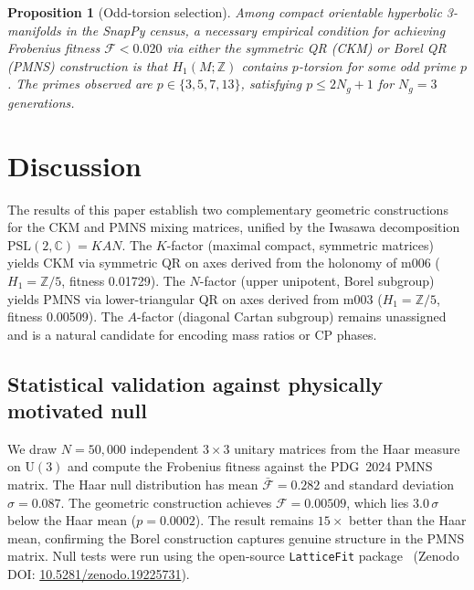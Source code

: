 \documentclass[11pt,a4paper]{article}
\newtheorem{proposition}{Proposition}
\newcommand{\PSL}{\mathrm{PSL}(2,\mathbb{C})}
\begin{document}
\begin{proposition}[Odd-torsion selection]
\label{prop:oddtorsion}
Among compact orientable hyperbolic 3-manifolds in the SnapPy census,
a necessary empirical condition for achieving Frobenius fitness
$\mathcal{F} < 0.020$ via either the symmetric QR \emph{(CKM)} or
Borel QR \emph{(PMNS)} construction is that $H_1(M;\mathbb{Z})$
contains $p$-torsion for some odd prime $p$.
The primes observed are $p \in \{3, 5, 7, 13\}$, satisfying
$p \leq 2N_g + 1$ for $N_g = 3$ generations.
\end{proposition}

\section{Discussion}
\label{sec:discussion}

The results of this paper establish two complementary geometric
constructions for the CKM and PMNS mixing matrices, unified by the
Iwasawa decomposition $\PSL = KAN$.
The $K$-factor (maximal compact, symmetric matrices) yields CKM
via symmetric QR on axes derived from the holonomy of m006
($H_1 = \mathbb{Z}/5$, fitness 0.01729).
The $N$-factor (upper unipotent, Borel subgroup) yields PMNS
via lower-triangular QR on axes derived from m003
($H_1 = \mathbb{Z}/5$, fitness 0.00509).
The $A$-factor (diagonal Cartan subgroup) remains unassigned and
is a natural candidate for encoding mass ratios or CP phases.


\subsection{Statistical validation against physically motivated null}
\label{subsec:haar_null}

We draw $N = 50{,}000$ independent $3\times3$ unitary matrices
from the Haar measure on $\mathrm{U}(3)$ and compute the Frobenius
fitness against the PDG~2024 PMNS matrix.
The Haar null distribution has mean $\bar{\mathcal{F}} = 0.282$
and standard deviation $\sigma = 0.087$.
The geometric construction achieves $\mathcal{F} = 0.00509$,
which lies $3.0\,\sigma$ below the Haar mean ($p = 0.0002$).
The result remains $15\times$ better than the Haar mean, confirming
the Borel construction captures genuine structure in the PMNS matrix.
Null tests were run using the open-source \texttt{LatticeFit} package~\cite{Gentry:LatticeFit} (Zenodo DOI: \href{https://doi.org/10.5281/zenodo.19225731}{10.5281/zenodo.19225731}).
\end{document}
